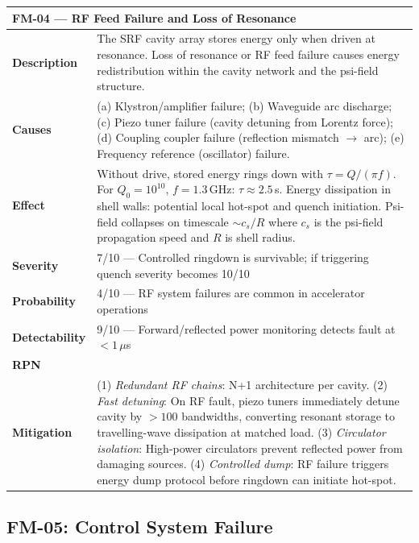 \documentclass[11pt,a4paper]{article}
\newcommand{\Smed}[1]{\cellcolor{risk-medium!40}{#1}}
\begin{document}
\begin{longtable}{p{0.25\tw}p{0.65\tw}}
\toprule
\multicolumn{2}{l}{\textbf{FM-04 --- RF Feed Failure and Loss of Resonance}} \\
\midrule
\endhead
\textbf{Description} &
  The SRF cavity array stores energy only when driven at resonance.
  Loss of resonance or RF feed failure causes energy redistribution
  within the cavity network and the psi-field structure. \\[4pt]
\textbf{Causes} &
  (a) Klystron/amplifier failure; (b) Waveguide arc discharge;
  (c) Piezo tuner failure (cavity detuning from Lorentz force);
  (d) Coupling coupler failure (reflection mismatch $\to$ arc);
  (e) Frequency reference (oscillator) failure. \\[4pt]
\textbf{Effect} &
  Without drive, stored energy rings down with $\tau = Q/(\pi f)$.
  For $Q_0 = 10^{10}$, $f = 1.3$\,GHz: $\tau \approx 2.5$\,s.
  Energy dissipation in shell walls: potential local hot-spot and
  quench initiation. Psi-field collapses on timescale $\sim c_s / R$
  where $c_s$ is the psi-field propagation speed and $R$ is shell
  radius. \\[4pt]
\textbf{Severity} & 7/10 --- Controlled ringdown is survivable; if
  triggering quench severity becomes 10/10 \\[4pt]
\textbf{Probability} & 4/10 --- RF system failures are common in
  accelerator operations \\[4pt]
\textbf{Detectability} & 9/10 --- Forward/reflected power monitoring
  detects fault at $< 1\,\mu$s \\[4pt]
\textbf{RPN} & \Smed{$7 \times 4 \times (11-9) = 56$} \\[4pt]
\textbf{Mitigation} &
  (1) \textit{Redundant RF chains}: N+1 architecture per cavity.
  (2) \textit{Fast detuning}: On RF fault, piezo tuners immediately
  detune cavity by $> 100$ bandwidths, converting resonant storage to
  travelling-wave dissipation at matched load.
  (3) \textit{Circulator isolation}: High-power circulators prevent
  reflected power from damaging sources.
  (4) \textit{Controlled dump}: RF failure triggers energy dump
  protocol before ringdown can initiate hot-spot. \\
\bottomrule
\end{longtable}

\subsection{FM-05: Control System Failure}
\end{document}
